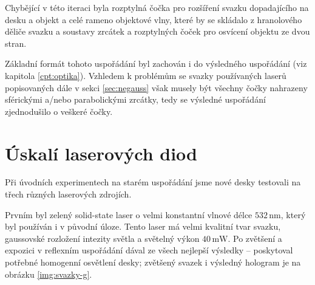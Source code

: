 \documentclass[twoside,project]{../MFFPrace}
\begin{document}
Chybějící v této iteraci byla rozptylná čočka pro rozšíření svazku dopadajícího na desku a objekt a celé rameno objektové vlny, které by se skládalo z hranolového děliče svazku a soustavy zrcátek a rozptylných čoček pro osvícení objektu ze dvou stran.

\medskip

Základní formát tohoto uspořádání byl zachován i do výsledného uspořádání (viz kapitola \ref{cpt:optika}). Vzhledem k problémům se svazky používaných laserů popisovaných dále v sekci \ref{sec:negauss} však musely být všechny čočky nahrazeny sférickými a/nebo parabolickými zrcátky, tedy se výsledné uspořádání zjednodušilo o veškeré čočky.


\section{Úskalí laserových diod\label{sec:diody}}
Při úvodních experimentech na starém uspořádání jsme nové desky testovali na třech různých laserových zdrojích.

Prvním byl zelený solid-state laser o velmi konstantní vlnové délce $532\,\text{nm}$, který byl používán i v původní úloze. Tento laser má velmi kvalitní tvar svazku, gaussovské rozložení intezity světla a světelný výkon $40\,\text{mW}$. Po zvětšení a expozici v reflexním uspořádání dával ze všech nejlepší výsledky -- poskytoval potřebné homogenní osvětlení desky; zvětšený svazek i výsledný hologram je na obrázku \ref{img:svazky-g}. %
\end{document}
